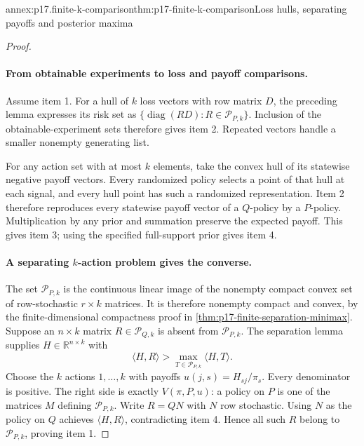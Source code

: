 \begin{annexitem}{annex:p17.finite-k-comparison}{thm:p17-finite-k-comparison}{Loss hulls, separating payoffs and posterior maxima}
\begin{proof}
\paragraph{From obtainable experiments to loss and payoff comparisons.}
Assume item 1. For a hull of \(k\) loss vectors with row matrix \(D\),
the preceding lemma expresses its risk set as
\(\{\operatorname{diag}(RD):R\in\mathcal P_{P,k}\}\).
Inclusion of the obtainable-experiment sets therefore gives item 2.
Repeated vectors handle a smaller nonempty generating list.

For any action set with at most \(k\) elements, take the convex hull
of its statewise negative payoff vectors. Every randomized policy selects
a point of that hull at each signal, and every hull point has such a
randomized representation. Item 2 therefore reproduces every statewise
payoff vector of a \(Q\)-policy by a \(P\)-policy. Multiplication by any
prior and summation preserve the expected payoff. This gives item 3;
using the specified full-support prior gives item 4.

\paragraph{A separating \(k\)-action problem gives the converse.}
The set \(\mathcal P_{P,k}\) is the continuous linear image of the
nonempty compact convex set of row-stochastic \(r\times k\) matrices.
It is therefore nonempty compact and convex, by the finite-dimensional
compactness proof in \cref{thm:p17-finite-separation-minimax}.
Suppose an \(n\times k\) matrix \(R\in\mathcal P_{Q,k}\) is absent from
\(\mathcal P_{P,k}\). The separation lemma supplies \(H\in\mathbb R^{n\times k}\)
with
\[
                 \langle H,R\rangle>
                     \max_{T\in\mathcal P_{P,k}}\langle H,T\rangle.
\]
Choose the \(k\) actions \(1,\ldots,k\) with payoffs
\(u(j,s)=H_{sj}/\pi_s\). Every denominator is positive.
The right side is exactly \(V(\pi,P,u)\): a policy on \(P\) is one
of the matrices \(M\) defining \(\mathcal P_{P,k}\).
Write \(R=QN\) with \(N\) row stochastic. Using \(N\) as the policy
on \(Q\) achieves \(\langle H,R\rangle\), contradicting item 4.
Hence all such \(R\) belong to \(\mathcal P_{P,k}\), proving item 1.


\end{proof}
\end{annexitem}
